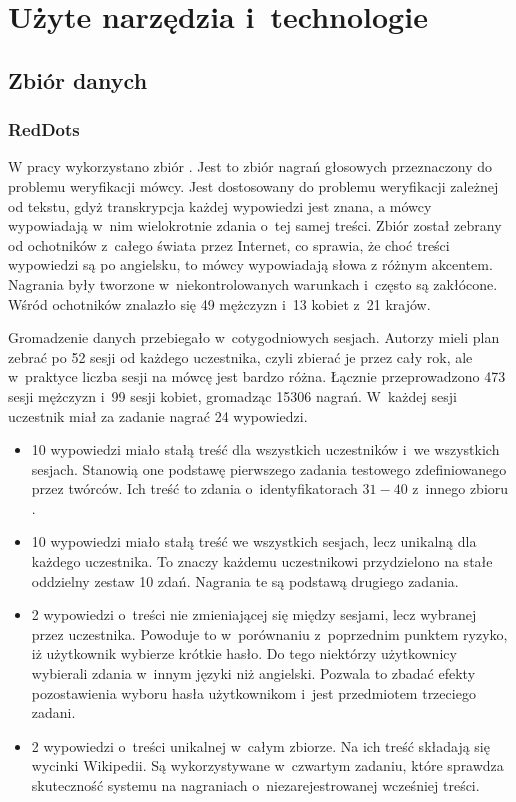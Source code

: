 \chapter{Użyte narzędzia i~technologie}\label{chap:technologie}

\section{Zbiór danych}\label{sec:zbior_danych}

\subsection{RedDots}

W pracy wykorzystano zbiór \cite{theReddotsDataCollection}.
Jest to zbiór nagrań głosowych przeznaczony do problemu weryfikacji mówcy.
Jest dostosowany do problemu weryfikacji zależnej od tekstu, gdyż transkrypcja każdej wypowiedzi jest znana,
a mówcy wypowiadają w~nim wielokrotnie zdania o~tej samej treści. Zbiór został zebrany od ochotników z~całego
świata przez Internet, co sprawia, że choć treści wypowiedzi są po angielsku, to mówcy wypowiadają słowa
z różnym akcentem. Nagrania były tworzone w~niekontrolowanych warunkach i~często są zakłócone.
Wśród ochotników znalazło się 49 mężczyzn i~13 kobiet z~21 krajów.

Gromadzenie danych przebiegało w~cotygodniowych sesjach. Autorzy mieli plan zebrać po 52 sesji od każdego uczestnika,
czyli zbierać je przez cały rok, ale w~praktyce liczba sesji na mówcę jest bardzo różna. Łącznie przeprowadzono
473 sesji mężczyzn i~99 sesji kobiet, gromadząc 15306 nagrań. W~każdej sesji uczestnik miał za zadanie nagrać 24 wypowiedzi.

\begin{itemize}
    \item 10 wypowiedzi miało stałą treść dla wszystkich uczestników i~we wszystkich sesjach. Stanowią one podstawę
        pierwszego zadania testowego zdefiniowanego przez twórców. Ich treść to zdania o~identyfikatorach $31-40$
        z~innego zbioru \cite{darpaTimitAcoustic}.
    \item 10 wypowiedzi miało stałą treść we wszystkich sesjach, lecz unikalną dla każdego uczestnika. To znaczy
        każdemu uczestnikowi przydzielono na stałe oddzielny zestaw 10 zdań. Nagrania te są podstawą drugiego zadania.
    \item 2 wypowiedzi o~treści nie zmieniającej się między sesjami, lecz wybranej przez uczestnika. Powoduje
        to w~porównaniu z~poprzednim punktem ryzyko, iż użytkownik wybierze krótkie hasło. Do tego niektórzy
        użytkownicy wybierali zdania w~innym języki niż angielski. Pozwala to zbadać efekty pozostawienia wyboru hasła
        użytkownikom i~jest przedmiotem trzeciego zadani.
    \item 2 wypowiedzi o~treści unikalnej w~całym zbiorze. Na ich treść składają się wycinki Wikipedii. Są wykorzystywane
        w~czwartym zadaniu, które sprawdza skuteczność systemu na nagraniach o~niezarejestrowanej wcześniej treści.
\end{itemize}

